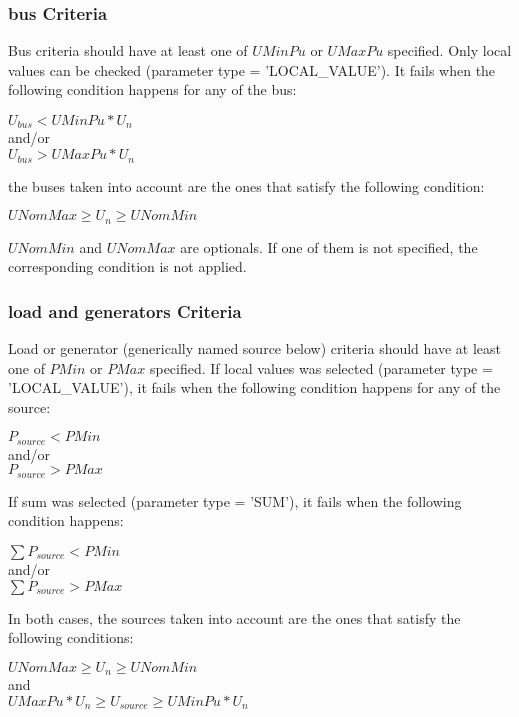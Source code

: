 \documentclass[a4paper, 12pt]{report}
\begin{document}
\subsubsection{bus Criteria}

Bus criteria should have at least one of $UMinPu$ or $UMaxPu$ specified. Only
local values can be checked (parameter type = 'LOCAL\_VALUE').
It fails when the following condition happens for any of the bus: \\
\begin{center}
$U_{bus} < UMinPu*U_n$\\
and/or\\
$U_{bus} > UMaxPu*U_n$ \\
\end{center}
the buses taken into account are the ones that satisfy the
following condition:
\begin{center}
$UNomMax \ge U_n \ge UNomMin$\\
\end{center}

$UNomMin$ and $UNomMax$ are optionals. If one of them is not
specified, the corresponding condition is not applied.

\subsubsection{load and generators Criteria}

Load or generator (generically named source below) criteria should have at least
one of $PMin$ or $PMax$ specified.
If local values was selected  (parameter type = 'LOCAL\_VALUE'), it fails when
the following condition happens for any of the source:\\
\begin{center}
$P_{source} < PMin$\\
and/or\\
$P_{source} > PMax$\\
\end{center}
If sum was selected  (parameter type = 'SUM'), it fails when the
following condition happens: \\
\begin{center}
$\sum P_{source} < PMin$\\
and/or\\
$\sum P_{source} > PMax$ \\
\end{center}
In both cases, the sources taken into account are the ones that satisfy the
following conditions:\\
\begin{center}
$UNomMax \ge U_n \ge UNomMin$\\
and\\
$UMaxPu*U_n \ge U_{source} \ge UMinPu*U_n$ \\
\end{center}
\end{document}
